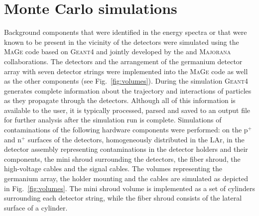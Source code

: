\section*{Monte Carlo simulations}
Background components that were identified in the energy spectra or that were known to be present in the vicinity of the detectors were simulated using the \textsc{MaGe} \cite{MaGe} code based on \textsc{Geant4} \cite{geant4} and jointly developed by the {\gerda} and \textsc{Majorana} \cite{majoranadem} collaborations. The detectors and the arrangement of the germanium detector array with seven detector strings were implemented into the \textsc{MaGe} code as well as the other {\gerda} components (see Fig.~\ref{fig:volumes}). During the simulation \textsc{Geant4} generates complete information about the trajectory and interactions of particles as they propagate through the detectors. Although all of this information is available to the user, it is typically processed, parsed and saved to an output file for further analysis after the simulation run is complete. Simulations of contaminations of the following hardware components were performed: on the p$^+$ and n$^+$ surfaces of the detectors, homogeneously distributed in the LAr, in the detector assembly representing contaminations in the detector holders and their components, the mini shroud surrounding the detectors, the fiber shroud, the high-voltage cables and the signal cables. The volumes representing the germanium array, the holder mounting and the cables are simulated as depicted in Fig.~\ref{fig:volumes}. The mini shroud volume is implemented as a set of cylinders surrounding each detector string, while the fiber shroud consists of the lateral surface of a cylinder.
